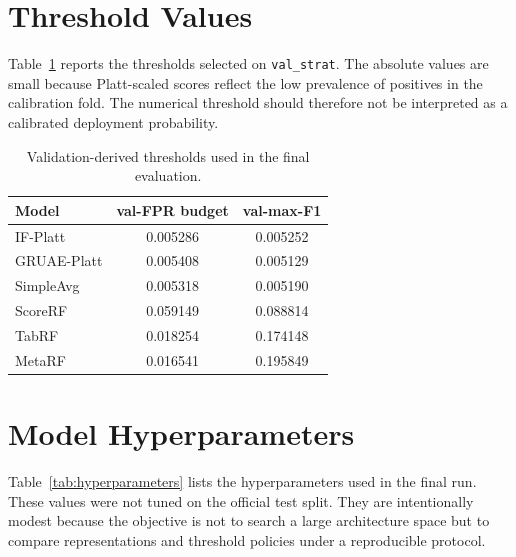 \documentclass[journal]{IEEEtran}
\begin{document}
\section{Threshold Values}
\label{app:thresholds}

Table~\ref{tab:thresholds} reports the thresholds selected on \texttt{val\_strat}. The absolute values are small because Platt-scaled scores reflect the low prevalence of positives in the calibration fold. The numerical threshold should therefore not be interpreted as a calibrated deployment probability.

\begin{table}[t]
\centering
\caption{Validation-derived thresholds used in the final evaluation.}
\label{tab:thresholds}
\begin{tabular}{lcc}
\toprule
\textbf{Model} & \textbf{val-FPR budget} & \textbf{val-max-F1} \\
\midrule
IF-Platt & 0.005286 & 0.005252 \\
GRUAE-Platt & 0.005408 & 0.005129 \\
SimpleAvg & 0.005318 & 0.005190 \\
ScoreRF & 0.059149 & 0.088814 \\
TabRF & 0.018254 & 0.174148 \\
MetaRF & 0.016541 & 0.195849 \\
\bottomrule
\end{tabular}
\end{table}

\section{Model Hyperparameters}
\label{app:hyperparameters}

Table~\ref{tab:hyperparameters} lists the hyperparameters used in the final run. These values were not tuned on the official test split. They are intentionally modest because the objective is not to search a large architecture space but to compare representations and threshold policies under a reproducible protocol.
\end{document}
